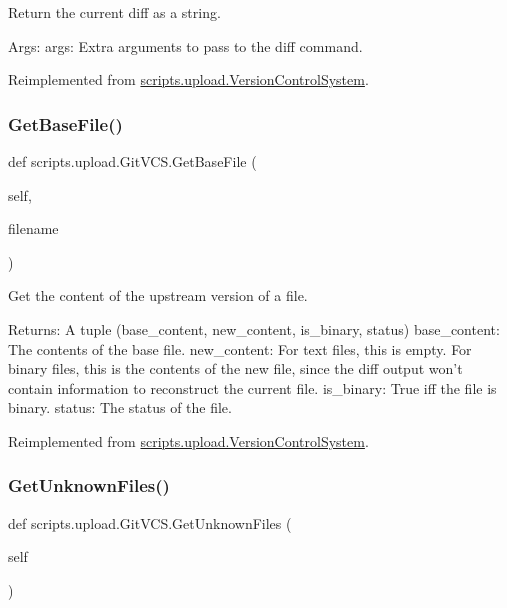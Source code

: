 \begin{DoxyVerb}Return the current diff as a string.

Args:
  args: Extra arguments to pass to the diff command.
\end{DoxyVerb}
 

Reimplemented from \mbox{\hyperlink{classscripts_1_1upload_1_1_version_control_system_ac687c3bb7840db1b27f323ca8d63c89b}{scripts.\+upload.\+Version\+Control\+System}}.

\mbox{\label{classscripts_1_1upload_1_1_git_v_c_s_ace8b049081fca38f0794d4b17cd5f5cd}} 
\subsubsection{\texorpdfstring{GetBaseFile()}{GetBaseFile()}}
{\footnotesize\ttfamily def scripts.\+upload.\+Git\+V\+C\+S.\+Get\+Base\+File (\begin{DoxyParamCaption}\item[{}]{self,  }\item[{}]{filename }\end{DoxyParamCaption})}

\begin{DoxyVerb}Get the content of the upstream version of a file.

Returns:
  A tuple (base_content, new_content, is_binary, status)
base_content: The contents of the base file.
new_content: For text files, this is empty.  For binary files, this is
  the contents of the new file, since the diff output won't contain
  information to reconstruct the current file.
is_binary: True iff the file is binary.
status: The status of the file.
\end{DoxyVerb}
 

Reimplemented from \mbox{\hyperlink{classscripts_1_1upload_1_1_version_control_system_ae50b1c259d0f1e12e855a142c8ee04e4}{scripts.\+upload.\+Version\+Control\+System}}.

\mbox{\label{classscripts_1_1upload_1_1_git_v_c_s_afab4ff2428d5e4220f376471aa53e90e}} 
\subsubsection{\texorpdfstring{GetUnknownFiles()}{GetUnknownFiles()}}
{\footnotesize\ttfamily def scripts.\+upload.\+Git\+V\+C\+S.\+Get\+Unknown\+Files (\begin{DoxyParamCaption}\item[{}]{self }\end{DoxyParamCaption})}

